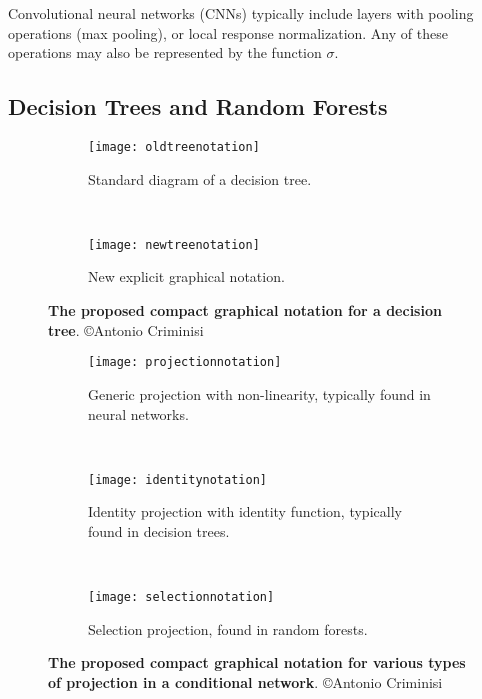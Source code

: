 \documentclass[thesis]{subfiles}
\begin{document}
Convolutional neural networks (CNNs) typically include layers with pooling operations (\eg max pooling), or local response normalization. Any of these operations may also be represented by the function $\sigma$.

\subsection{Decision Trees and Random Forests}
\begin{figure}[htbp!] 
\centering
\begin{subfigure}[b]{0.45\textwidth}
   \centering
   \texttt{[image: oldtreenotation]}
   \caption{Standard diagram of a decision tree.}
   \label{fig:oldtreenotation}
\end{subfigure}
~
\begin{subfigure}[b]{0.45\textwidth}
   \centering
   \texttt{[image: newtreenotation]}
   \caption{New explicit graphical notation.}
   \label{fig:newtreenotation}
\end{subfigure}
\caption[New graphical notation for a binary decision tree.]{{\bf The proposed compact graphical notation for a decision tree}. \copyright Antonio Criminisi}
\label{fig:decisionTree}
\end{figure}

\begin{figure}[htbp!] 
\centering
\begin{subfigure}[b]{\textwidth}
   \centering
   \texttt{[image: projectionnotation]}
   \caption{Generic projection with non-linearity, typically found in neural networks.}
   \label{fig:projectionnotation}
\end{subfigure}
~
\begin{subfigure}[b]{\textwidth}
   \centering
   \texttt{[image: identitynotation]}
   \caption{Identity projection with identity function, typically found in decision trees.}
   \label{fig:identitynotation}
\end{subfigure}
~
\begin{subfigure}[b]{\textwidth}
   \centering
   \texttt{[image: selectionnotation]}
   \caption{Selection projection, found in random forests.}
   \label{fig:selectionnotation}
\end{subfigure}
\caption[Various projection matrices in conditional networks.]{{\bf The proposed compact graphical notation for various types of projection in a conditional network}. \copyright Antonio Criminisi}
\label{fig:projections}
\end{figure}
\end{document}
